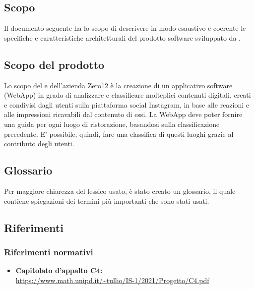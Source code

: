 \subsection{Scopo}
Il documento seguente ha lo scopo di descrivere in modo esaustivo e coerente le specifiche e caratteristiche architetturali del prodotto software sviluppato da \teamname{}.

\subsection{Scopo del prodotto}
Lo scopo del \teamname{} e dell'azienda Zero12 è la creazione di un applicativo software (WebApp) in grado di analizzare e 
classificare molteplici contenuti digitali, creati e condivisi dagli utenti sulla piattaforma social Instagram, in base alle reazioni e alle impressioni ricavabili dal contenuto di essi. 
La WebApp deve poter fornire una guida per ogni luogo di ristorazione, basandosi sulla classificazione precedente. 
E' possibile, quindi, fare una classifica di questi luoghi grazie al contributo degli utenti.

\subsection{Glossario}
Per maggiore chiarezza del lessico usato, è stato creato un glossario, il quale 
contiene spiegazioni dei termini più importanti che sono stati usati.

\subsection{Riferimenti}
\subsubsection{Riferimenti normativi}
\begin{itemize}
	\item
	{\textbf{Capitolato d'appalto C4:}}\\\url{https://www.math.unipd.it/~tullio/IS-1/2021/Progetto/C4.pdf}
    
\end{itemize}
